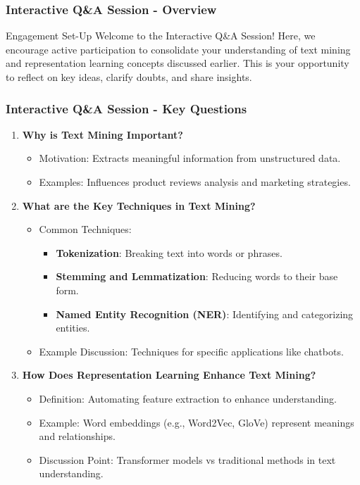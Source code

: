 \documentclass[aspectratio=169]{beamer}
\begin{document}
\begin{frame}[fragile]
    \frametitle{Interactive Q\&A Session - Overview}
    \begin{block}{Engagement Set-Up}
        Welcome to the Interactive Q\&A Session! Here, we encourage active participation to consolidate your understanding of text mining and representation learning concepts discussed earlier. This is your opportunity to reflect on key ideas, clarify doubts, and share insights.
    \end{block}
\end{frame}

\begin{frame}[fragile]
    \frametitle{Interactive Q\&A Session - Key Questions}
    \begin{enumerate}
        \item \textbf{Why is Text Mining Important?}
            \begin{itemize}
                \item Motivation: Extracts meaningful information from unstructured data.
                \item Examples: Influences product reviews analysis and marketing strategies.
            \end{itemize}
        
        \item \textbf{What are the Key Techniques in Text Mining?}
            \begin{itemize}
                \item Common Techniques:
                    \begin{itemize}
                        \item \textbf{Tokenization}: Breaking text into words or phrases.
                        \item \textbf{Stemming and Lemmatization}: Reducing words to their base form.
                        \item \textbf{Named Entity Recognition (NER)}: Identifying and categorizing entities.
                    \end{itemize}
                \item Example Discussion: Techniques for specific applications like chatbots.
            \end{itemize}
        
        \item \textbf{How Does Representation Learning Enhance Text Mining?}
            \begin{itemize}
                \item Definition: Automating feature extraction to enhance understanding.
                \item Example: Word embeddings (e.g., Word2Vec, GloVe) represent meanings and relationships.
                \item Discussion Point: Transformer models vs traditional methods in text understanding.
            \end{itemize}
    \end{enumerate}
\end{frame}
\end{document}
